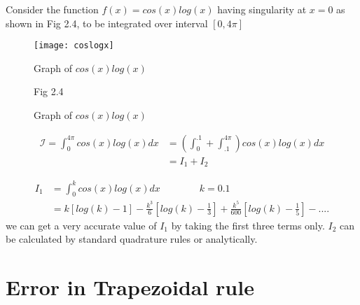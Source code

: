 \documentclass[../document.tex]{subfiles}
\begin{document}
	\begin{examp} Consider the function $f(x)=cos(x)log(x)$ having singularity at $x=0$ as shown in Fig 2.4, to be integrated over interval $[0,4\pi]$
		
		\begin{figure}[h] \label{coslogx}
			\texttt{[image: coslogx]}
			\centering	
			\caption{Graph of $ cos(x)log(x)$}		
			
			\begin{center}
				Graph of $ cos(x)log(x)$
				
				\vspace{1mm}
				
				Fig  2.4
			\end{center}
		\end{figure}
		\begin{equation*}
			\begin{split}
				\mathcal{I} = \int_{0}^{4\pi} cos(x)log(x)dx  &= 
				\left( \int_{0}^{.1} + \int_{.1}^{4\pi}   \right) cos(x)log(x)dx
				\\ &=  I_1  + I_2
			\end{split}
		\end{equation*}
		
		\begin{equation*}
			\begin{split}
				I_1 &= \int_0^{k}  cos(x)log(x)dx \qquad \qquad  k =0.1\\
				&= k\left[ log(k) - 1 \right]  - \frac{k^3}{6}\left[log(k) - \frac{1}{3} \right] + \frac{k^5}{600}\left[ log(k) - \frac{1}{5} \right] - .... 
			\end{split}
		\end{equation*}
		we can get a very accurate value of $I_1$ by taking the first three terms only. $I_2$  can be calculated by standard quadrature rules or analytically.
		
	\end{examp}
	
	\section{Error in Trapezoidal rule}
	
\end{document}
